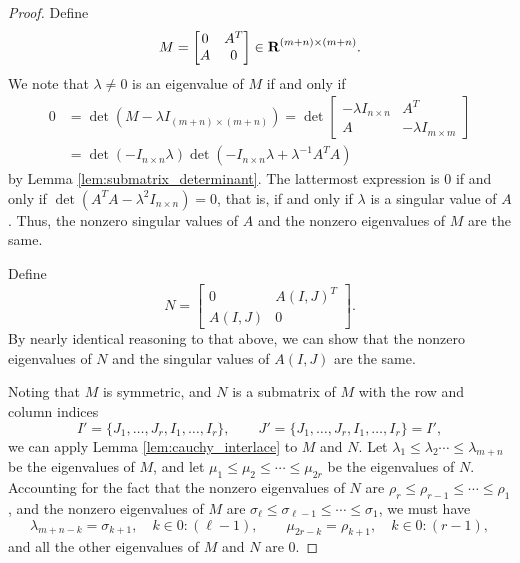 \documentclass{article}
\begin{document}
	\begin{proof}
		Define
		\begin{equation}
			M = \left[\begin{matrix}
				0 & A^T \\
				A & 0
			\end{matrix}\right] \in \textnormal{\bf R}^{(m+n)\times(m+n)}.
		\end{equation}
		We note that $\lambda\ne 0$ is an eigenvalue of $M$ if and only if
		\begin{align}
			0 &= \det(M - \lambda I_{(m+n)\times(m+n)}) = \det\left[\begin{matrix}
				-\lambda I_{n\times n} & A^T \\
				A & -\lambda I_{m\times m}
			\end{matrix}\right] \\
			&= \det(-I_{n\times n}\lambda)\det(-I_{n\times n}\lambda + \lambda^{-1}A^TA)
		\end{align}
		by Lemma \ref{lem:submatrix_determinant}. The lattermost expression is 0 if and only if $\det(A^TA - \lambda^2I_{n\times n}) = 0$, that is, if and only if $\lambda$ is a singular value of $A$. Thus, the nonzero singular values of $A$ and the nonzero eigenvalues of $M$ are the same.
		
		Define
		\begin{equation}
			N = \left[\begin{matrix}
				0 & A(I,J)^T \\
				A(I,J) & 0
			\end{matrix}\right].
		\end{equation}
		By nearly identical reasoning to that above, we can show that the nonzero eigenvalues of $N$ and the singular values of $A(I,J)$ are the same.
		
		Noting that $M$ is symmetric, and $N$ is a submatrix of $M$ with the row and column indices
		\begin{equation}
			I' = \{J_1, \dots, J_r, I_1,\dots,I_r\}, \qquad J' = \{J_1, \dots, J_r, I_1,\dots,I_r\} = I',
		\end{equation}
		we can apply Lemma \ref{lem:cauchy_interlace} to $M$ and $N$. Let $\lambda_1 \le \lambda_2\cdots \le \lambda_{m+n}$ be the eigenvalues of $M$, and let $\mu_1\le \mu_2\le\cdots\le \mu_{2r}$ be the eigenvalues of $N$. Accounting for the fact that the nonzero eigenvalues of $N$ are $\rho_r \le \rho_{r-1} \le \cdots \le \rho_1$, and the nonzero eigenvalues of $M$ are $\sigma_\ell \le \sigma_{\ell-1} \le \cdots \le \sigma_1$, we must have
		\begin{equation}
			\lambda_{m+n-k} = \sigma_{k+1}, \quad k \in 0:(\ell -1), \qquad \mu_{2r-k} = \rho_{k+1}, \quad k \in 0:(r-1),
		\end{equation}
		and all the other eigenvalues of $M$ and $N$ are 0.
		

\end{proof}
\end{document}
